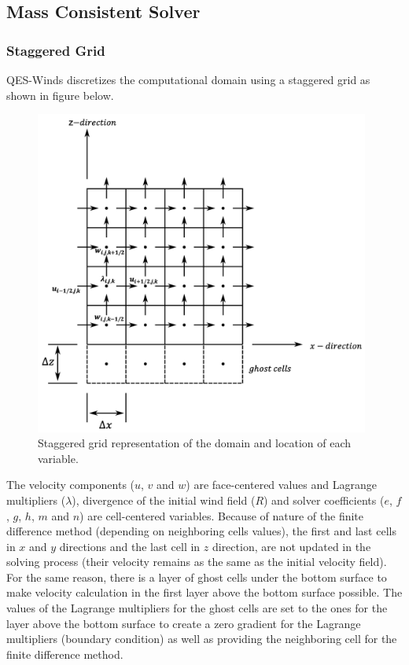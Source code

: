 \subsection{Mass Consistent Solver}

\subsubsection{Staggered Grid}

QES-Winds discretizes the computational domain using a staggered grid as shown in figure below.

\begin{figure}[h!]
\includegraphics[width=11cm]{Images/staggered_grid_full.png}
\caption{Staggered grid representation of the domain and location of each variable.}
\end{figure}

The velocity components ($u$, $v$ and $w$) are face-centered values and Lagrange multipliers ($\lambda$), divergence of the initial wind field ($R$) and solver coefficients ($e$, $f$, $g$, $h$, $m$ and $n$) are cell-centered variables. Because of nature of the finite difference method (depending on neighboring cells values), the first and last cells in $x$ and $y$ directions and the last cell in $z$ direction, are not updated in the solving process (their velocity remains as the same as the initial velocity field). For the same reason, there is a layer of ghost cells under the bottom surface to make velocity calculation in the first layer above the bottom surface possible. The values of the Lagrange multipliers for the ghost cells are set to the ones for the layer above the bottom surface to create a zero gradient for the Lagrange multipliers (boundary condition) as well as providing the neighboring cell for the finite difference method.

